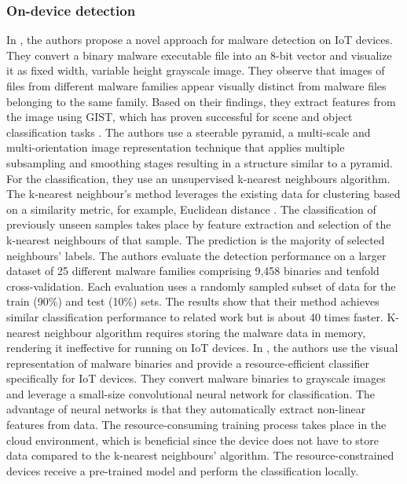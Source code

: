 \documentclass[conference, 11pt]{IEEEtran}
\begin{document}
    \subsubsection{On-device detection}
    In \cite{article:7}, the authors propose a novel approach for malware detection on IoT devices.
    They convert a binary malware executable file into an 8-bit vector and visualize it as fixed width, variable height grayscale image.
    They observe that images of files from different malware families appear visually distinct from malware files belonging to the same family.
    Based on their findings, they extract features from the image using GIST, which has proven successful for scene and object classification tasks \cite{torralba2003context}.
    The authors use a steerable pyramid, a multi-scale and multi-orientation image representation technique that applies multiple subsampling and smoothing stages resulting in a structure similar to a pyramid.
    For the classification, they use an unsupervised k-nearest neighbours algorithm.
    The k-nearest neighbour's method leverages the existing data for clustering based on a similarity metric, for example, Euclidean distance \cite{taunk2019brief}.
    The classification of previously unseen samples takes place by feature extraction and selection of the k-nearest neighbours of that sample.
    The prediction is the majority of selected neighbours' labels.
    The authors evaluate the detection performance on a larger dataset of 25 different malware families comprising 9,458 binaries and tenfold cross-validation.
    Each evaluation uses a randomly sampled subset of data for the train (90\%) and test (10\%) sets.
    The results show that their method achieves similar classification performance to related work but is about 40 times faster.
    K-nearest neighbour algorithm requires storing the malware data in memory, rendering it ineffective for running on IoT devices.
    In \cite{article:3}, the authors use the visual representation of malware binaries and provide a resource-efficient classifier specifically for IoT devices.
    They convert malware binaries to grayscale images and leverage a small-size convolutional neural network for classification.
    The advantage of neural networks is that they automatically extract non-linear features from data.
    The resource-consuming training process takes place in the cloud environment, which is beneficial since the device does not have to store data compared to the k-nearest neighbours' algorithm.
    The resource-constrained devices receive a pre-trained model and perform the classification locally.
\end{document}
